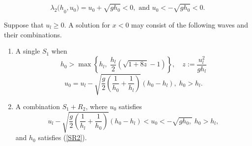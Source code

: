 \documentclass[10pt,a4paper]{amsart}
\begin{document}
\begin{equation} \label{r2r}
\lambda_{2}{(h}_{0},u_{0}) = u_{0} + \sqrt{gh_{0}} < 0, 
\text{ and  } u_{0} < - \sqrt{gh_{0}}<0.
\end{equation}

\begin{lemma} \label{lemma2}
Suppose that $u_{l}\geq 0$. A solution for $x<0$ may consist of
the following waves and their combinations.
\begin{enumerate}
\item A single $S_{1}$ when
\begin{equation} \label{SR2}
h_{0} > \max \left\{ h_{l}, \; \frac{h_l}{2}\left( \sqrt{1 + 8z} - 1 \right)\right\},
\quad z:=\frac{u_l^2}{gh_l}
\end{equation}
\begin{equation} \label{S}
u_{0} = u_{l} - \sqrt{\frac{g}{2} \left( \frac{1}{h_{0}} + \frac{1}{h_{l}} \right)}
\left( h_{0} - h_{l} \right), \; h_{0} > h_{l}.
\end{equation}
\item A combination $S_{1}+R_{2}$, where $u_{0}$ satisfies
\begin{equation} \label{SR}
u_{l} - \sqrt{\frac{g}{2}\left( \frac{1}{h_{l}} + \frac{1}{h_{0}} \right)}
\left( h_{0} - h_{l} \right) < u_{0} 
< -\sqrt{gh_{0},}\;  h_{0} > h_{l},
\end{equation}
and $h_{0}$ satisfies (\ref{SR2}).
\end{enumerate}
\end{lemma}
\end{document}
